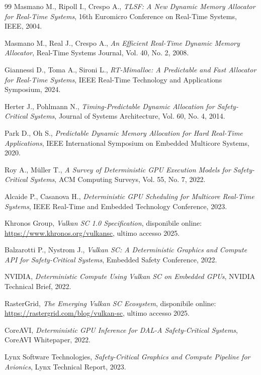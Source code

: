 \documentclass[italian, Lau, oneside]{sapthesis} %
\begin{document}
\begin{thebibliography}{99}
Masmano M., Ripoll I., Crespo A., \textit{TLSF: A New Dynamic Memory Allocator for Real-Time Systems}, 16th Euromicro Conference on Real-Time Systems, IEEE, 2004.

Masmano M., Real J., Crespo A., \textit{An Efficient Real-Time Dynamic Memory Allocator}, Real-Time Systems Journal, Vol. 40, No. 2, 2008.

Giannessi D., Toma A., Sironi L., \textit{RT-Mimalloc: A Predictable and Fast Allocator for Real-Time Systems}, IEEE Real-Time Technology and Applications Symposium, 2024.

Herter J., Pohlmann N., \textit{Timing-Predictable Dynamic Allocation for Safety-Critical Systems}, Journal of Systems Architecture, Vol. 60, No. 4, 2014.

Park D., Oh S., \textit{Predictable Dynamic Memory Allocation for Hard Real-Time Applications}, IEEE International Symposium on Embedded Multicore Systems, 2020.

Roy A., Müller T., \textit{A Survey of Deterministic GPU Execution Models for Safety-Critical Systems}, ACM Computing Surveys, Vol. 55, No. 7, 2022.

Alcaide P., Casanova H., \textit{Deterministic GPU Scheduling for Multicore Real-Time Systems}, IEEE Real-Time and Embedded Technology Conference, 2023.

Khronos Group, \textit{Vulkan SC 1.0 Specification}, disponibile online: \url{https://www.khronos.org/vulkansc}, ultimo accesso 2025.

Balzarotti P., Nystrom J., \textit{Vulkan SC: A Deterministic Graphics and Compute API for Safety-Critical Systems}, Embedded Safety Conference, 2022.

NVIDIA, \textit{Deterministic Compute Using Vulkan SC on Embedded GPUs}, NVIDIA Technical Brief, 2022.

RasterGrid, \textit{The Emerging Vulkan SC Ecosystem}, disponibile online: \url{https://rastergrid.com/blog/vulkan-sc}, ultimo accesso 2025.

CoreAVI, \textit{Deterministic GPU Inference for DAL-A Safety-Critical Systems}, CoreAVI Whitepaper, 2022.

Lynx Software Technologies, \textit{Safety-Critical Graphics and Compute Pipeline for Avionics}, Lynx Technical Report, 2023.

\end{thebibliography}
\end{document}
